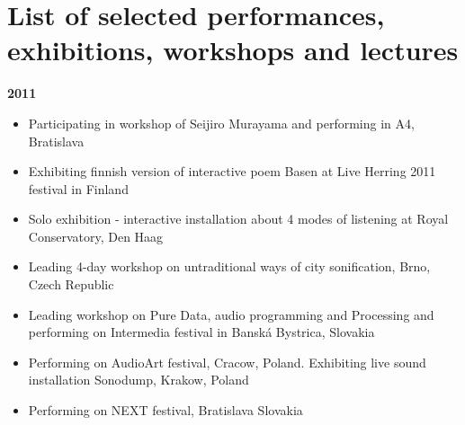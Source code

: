 \chapter{List of selected performances, exhibitions, workshops and lectures}
\singlespacing

\textbf{2011}
\begin{itemize}
\item Participating in workshop of Seijiro Murayama and performing in A4, Bratislava
\item Exhibiting finnish version of interactive poem Basen at Live Herring 2011 festival in Finland
\item Solo exhibition - interactive installation about 4 modes of listening at Royal Conservatory, Den Haag
\item Leading 4-day workshop on untraditional ways of city sonification, Brno, Czech Republic
\item Leading workshop on Pure Data, audio programming and Processing and performing on Intermedia festival in Banská Bystrica, Slovakia
\item Performing on AudioArt festival, Cracow, Poland. Exhibiting live sound installation Sonodump, Krakow, Poland
\item Performing on NEXT festival, Bratislava Slovakia
\end{itemize}
\vspace{1cm}

